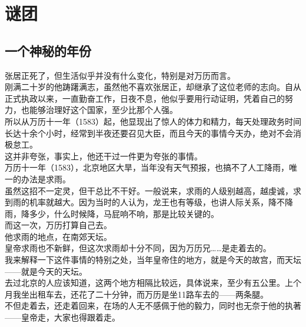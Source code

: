 \section{谜团}
\ifnum{}
	\begin{multicols}{\theparacolNo}
\fi
\subsection{一个神秘的年份}
张居正死了，但生活似乎并没有什么变化，特别是对万历而言。\\

刚满二十岁的他踌躇满志，虽然他不喜欢张居正，却继承了这位老师的志向。自从正式执政以来，一直勤奋工作，日夜不息，他似乎要用行动证明，凭着自己的努力，也能够治理好这个国家，至少比那个人强。\\

所以从万历十一年（1583）起，他显现出了惊人的体力和精力，每天处理政务时间长达十余个小时，经常到半夜还要召见大臣，而且今天的事情今天办，绝对不会消极怠工。\\

这并非夸张，事实上，他还干过一件更为夸张的事情。\\

万历十一年（1583），北京地区大旱，当年没有天气预报，也搞不了人工降雨，唯一的办法是求雨。\\

虽然这招不一定灵，但干总比不干好。一般说来，求雨的人级别越高，越虔诚，求到雨的机率就越大。因为当时的人认为，龙王也有等级，也讲人际关系，降不降雨，降多少，什么时候降，马屁响不响，那是比较关键的。\\

而这一次，万历打算自己去。\\

他求雨的地点，在南郊天坛。\\

皇帝求雨也不新鲜，但这次求雨却十分不同，因为万历兄……是走着去的。\\

我来解释一下这件事情的特别之处，当年皇帝住的地方，就是今天的故宫，而天坛——就是今天的天坛。\\

去过北京的人应该知道，这两个地方相隔比较远，具体说来，至少有五公里。上个月我坐出租车去，还花了二十分钟，而万历是坐11路车去的——两条腿。\\

不但走着去，还走着回来，在场的人无不感佩于他的毅力，同时也无奈于他的执著——皇帝走，大家也得跟着走。\\


\end{multicols}
